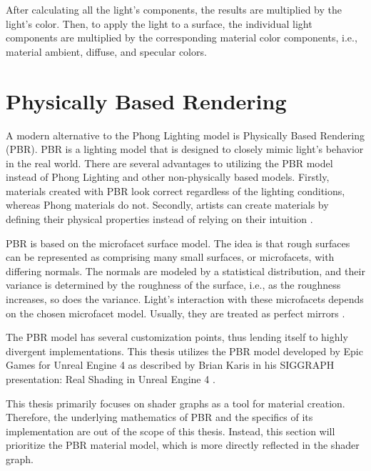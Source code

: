 \documentclass[
  digital,     %
  oneside,     %
  nosansbold,  %
  nocolorbold, %
  lof,         %
  lot,         %
]{fithesis4}
\begin{document}
After calculating all the light's components, the results are multiplied by the light's color.
Then, to apply the light to a surface, the individual light components are multiplied
by the corresponding material color components, i.e., material ambient, diffuse, and specular colors.

\section{Physically Based Rendering}
A modern alternative to the Phong Lighting model is Physically Based Rendering (PBR).
PBR is a lighting model that is designed to closely mimic light's behavior in the real world.
There are several advantages to utilizing the PBR model instead of Phong Lighting and other
non-physically based models. Firstly, materials created with PBR look correct regardless
of the lighting conditions, whereas Phong materials do not. Secondly, artists can create
materials by defining their physical properties instead of relying on their intuition \cite{learnopengl-pbr}\cite{ue-pbr}.

PBR is based on the microfacet surface model. The idea is that rough surfaces can be represented
as comprising many small surfaces, or microfacets, with differing normals. The normals
are modeled by a statistical distribution, and their variance is determined by the roughness of the surface,
i.e., as the roughness increases, so does the variance.
Light's interaction with these microfacets depends on the chosen microfacet model. Usually, they
are treated as perfect mirrors \cite{pbr-book-microfacet}.

The PBR model has several customization points, thus lending itself to highly divergent implementations.
This thesis utilizes the PBR model developed by Epic Games
for Unreal Engine 4 as described by Brian Karis in his SIGGRAPH presentation: Real Shading in
Unreal Engine 4 \cite{ue-real-shading}.

This thesis primarily focuses on shader graphs as a tool for material creation.
Therefore, the underlying mathematics of PBR and the specifics of its implementation are out of the scope
of this thesis. Instead, this section will prioritize the PBR material model, which is more
directly reflected in the shader graph.
\end{document}

